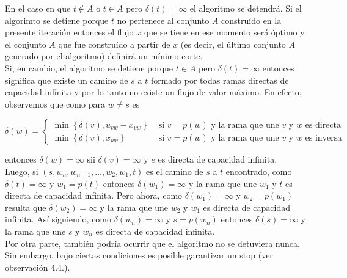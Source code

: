 \documentclass[10pt]{article}
\begin{document}
En el caso en que $t \notin A$ o $t \in A$ pero $\delta(t)=\infty$ el algoritmo se detendrá. Si el algorimto se detiene porque $t$ no pertenece al conjunto $A$ construído en la presente iteración entonces el flujo $x$ que se tiene en ese momento será óptimo y el conjunto $A$ que fue construído a partir de $x$ (es decir, el último conjunto $A$ generado por el algoritmo) definirá un mínimo corte.\\
Si, en cambio, el algoritmo se detiene porque $t \in A$ pero $\delta(t)=\infty$ entonces significa que existe un camino de $s$ a $t$ formado por todas ramas directas de capacidad infinita y por lo tanto no existe un flujo de valor máximo. En efecto, observemos que como para $w \neq s$ es

$$
\delta(w)= \begin{cases}\min \left\{\delta(v), u_{v w}-x_{v w}\right\} & \text { si } v=p(w) \text { y la rama que une } v \text { y } w \text { es directa } \\ \min \left\{\delta(v), x_{w v}\right\} & \text { si } v=p(w) \text { y la rama que une } v \text { y } w \text { es inversa }\end{cases}
$$

entonces $\delta(w)=\infty$ sii $\delta(v)=\infty$ y $e$ es directa de capacidad infinita.\\
Luego, si $\left(s, w_{n}, w_{n-1}, \ldots, w_{2}, w_{1}, t\right)$ es el camino de $s$ a $t$ encontrado, como $\delta(t)=\infty$ y $w_{1}=p(t)$ entonces $\delta\left(w_{1}\right)=\infty$ y la rama que une $w_{1}$ y $t$ es directa de capacidad infinita. Pero ahora, como $\delta\left(w_{1}\right)=\infty$ y $w_{2}=p\left(w_{1}\right)$ resulta que $\delta\left(w_{2}\right)=\infty$ y la rama que une $w_{2}$ y $w_{1}$ es directa de capacidad infinita. Así siguiendo, como $\delta\left(w_{n}\right)=\infty$ y $s=p\left(w_{n}\right)$ entonces $\delta(s)=\infty$ y la rama que une $s$ y $w_{n}$ es directa de capacidad infinita.\\
Por otra parte, también podría ocurrir que el algoritmo no se detuviera nunca. Sin embargo, bajo ciertas condiciones es posible garantizar un stop (ver observación 4.4.).
\end{document}
